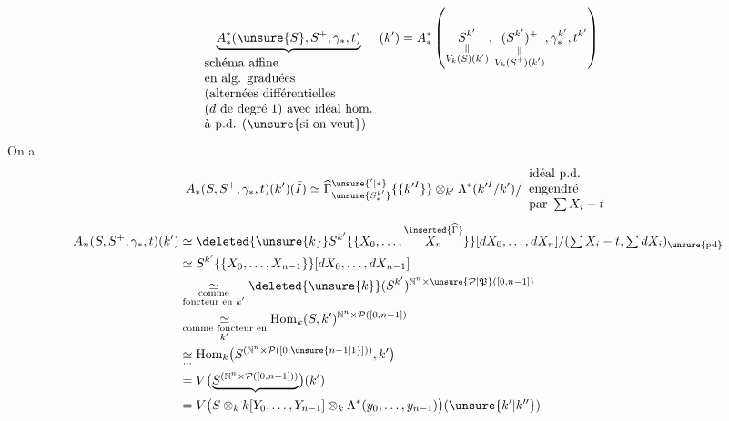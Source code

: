 
\[
\underbrace{A_*^*(\unsure{S},S^+,\gamma_*,t)}_{\begin{array}{l}\text{schéma affine}\\\text{en alg. graduées}\\\text{(alternées différentielles}\\\text{($d$ de degré 1) avec idéal hom.}\\\text{à p.d. (\unsure{si on veut})}\end{array}}(k')
=A_*^*\left(\underset{\substack{\Vert\\V_k(S)(k')}}{S^{k'}},\underset{\substack{\Vert\\V_k(S^+)(k')}}{(S^{k'})^+},\gamma_*^{k'},t^{k'}\right)
\]
On a
\[
 A_*(S,S^+,\gamma_*,t)(k')(\bar I)\simeq
 \widehat\Gamma^{\unsure{'|*}}_{\unsure{S_*^{k'}}}\{\{k'^I\}\}\otimes_{k'}\Lambda^*(k'^I/k')\big/\begin{array}{l}\text{idéal p.d.}\\\text{engendré}\\\text{par }\sum X_i-t\end{array}
\]
\[
\begin{aligned}
 A_n(S,S^+,\gamma_*,t)(k')
 &\simeq\deleted{\unsure{k}}S^{k'}\{\{X_0,\ldots,\overset{\inserted{\widehat\Gamma}}{X_n}\}\}[dX_0,\ldots,dX_n]/(\textstyle\sum X_i-t,\sum dX_i)_{\unsure{\mathrm{pd}}}\\
 &\simeq S^{k'}\{\{X_0,\ldots,X_{n-1}\}\}[dX_0,\ldots,dX_{n-1}]\\
 &\underset{\substack{\text{comme}\\\text{foncteur en }k'}}\simeq
 \deleted{\unsure{k}}(S^{k'})^{\mathbb N^n\times\unsure{\mathcal P|\mathfrak P}([0,n-1])}\\
 &\underset{\substack{\text{comme foncteur en}\\k'}}\simeq
 \operatorname{Hom}_k(S,k')^{\mathbb N^n\times\mathcal P([0,n-1])}\\
 &\underset{\cdots}\simeq\operatorname{Hom}_k\bigl(S^{(\mathbb N^n\times\mathcal P([0,\unsure{n-1|1}]))},k'\bigr)\\
 &=V\bigl(\underbrace{S^{(\mathbb N^n\times\mathcal P([0,n-1]))}}\bigr)(k')\\
 &=V\bigl(S\otimes_k k[Y_0,\ldots,Y_{n-1}]\otimes_k\Lambda^*(y_0,\ldots,y_{n-1})\bigr)(\unsure{k'|k''})
\end{aligned}
\]
